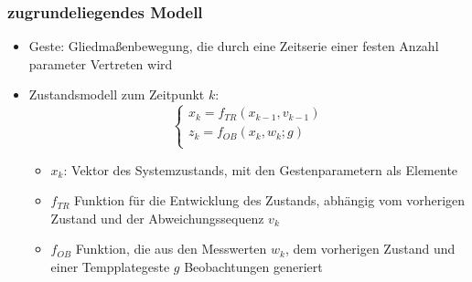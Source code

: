 \documentclass{beamer}
\begin{document}
\begin{frame}\frametitle{zugrundeliegendes Modell}
\begin{itemize}
\item Geste: Gliedmaßenbewegung, die durch eine Zeitserie einer festen Anzahl parameter Vertreten wird
\item Zustandsmodell zum Zeitpunkt $k$:
\begin{equation}
\left\{\begin{array}{l}
x_k = f_{TR} (x_{k-1}, v_{k-1}) \\
z_k = f_{OB} (x_k, w_k; g) \\
\end{array}\right.
\end{equation} 	
\begin{itemize}
\item $x_k$: Vektor des Systemzustands, mit den Gestenparametern als Elemente
\item $f_{TR}$ Funktion für die Entwicklung des Zustands, abhängig vom vorherigen Zustand und der Abweichungssequenz $v_k$
\item $f_{OB}$ Funktion, die aus den Messwerten $w_k$, dem vorherigen Zustand und einer Tempplategeste $g$ Beobachtungen generiert
\end{itemize}
\end{itemize}
\end{frame}
\end{document}
